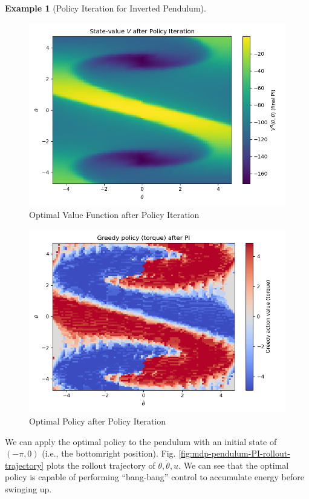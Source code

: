 \documentclass[
]{book}
\theoremstyle{definition}
\theoremstyle{definition}
\newtheorem{example}{Example}[chapter]
\theoremstyle{definition}
\theoremstyle{definition}
\theoremstyle{remark}
\begin{document}
\begin{example}[Policy Iteration for Inverted Pendulum]
\begin{figure}
{\centering \includegraphics[width=0.8\linewidth]{images/MDP/pendulum_PI_value} 

}

\caption{Optimal Value Function after Policy Iteration}\label{fig:mdp-pendulum-PI-value}
\end{figure}

\begin{figure}

{\centering \includegraphics[width=0.8\linewidth]{images/MDP/pendulum_PI_policy} 

}

\caption{Optimal Policy after Policy Iteration}\label{fig:mdp-pendulum-PI-policy}
\end{figure}

We can apply the optimal policy to the pendulum with an initial state of \((-\pi, 0)\) (i.e., the bottomright position). Fig. \ref{fig:mdp-pendulum-PI-rollout-trajectory} plots the rollout trajectory of \(\theta, \dot{\theta}, u\). We can see that the optimal policy is capable of performing ``bang-bang'' control to accumulate energy before swinging up.


\end{example}
\end{document}
